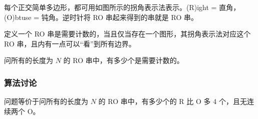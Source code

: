				每个正交简单多边形，都可用如图所示的拐角表示法表示。(R)ight = 直角，(O)btuse = 钝角。逆时针将 RO 串起来得到的串就是 RO 串。
				
				定义一个 RO 串是需要计数的，当且仅当存在一个图形，其拐角表示法对应这个 RO 串，且内有一点可以“看”到所有边界。
				
				问所有的长度为 $N$ 的 RO 串中，有多少个是需要计数的。
				
			\subsubsection{算法讨论}

				\begin{theorem}
					问题等价于问所有的长度为 $N$ 的 RO 串中，有多少个的 R 比 O 多 4 个，且无连续两个 O。
				\end{theorem}
